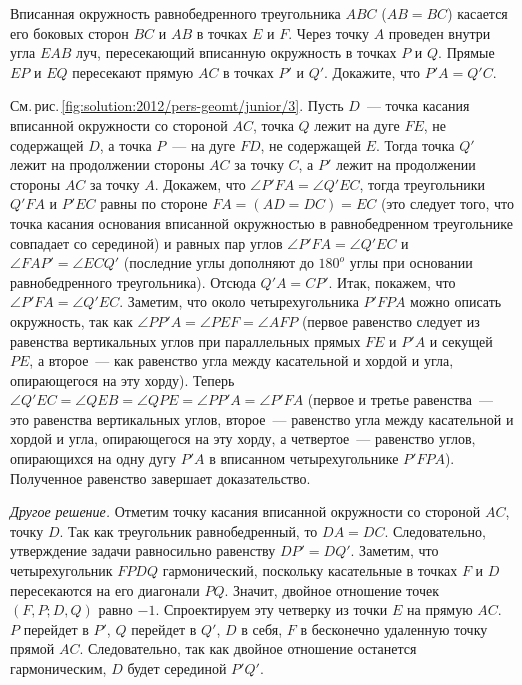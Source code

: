 \problem
Вписанная окружность равнобедренного треугольника $ABC$ ($AB = BC$) касается
его боковых сторон $BC$ и $AB$ в точках $E$ и $F$.
Через точку $A$ проведен внутри угла $EAB$ луч, пересекающий вписанную
окружность в точках $P$ и $Q$.
Прямые $EP$ и $EQ$ пересекают прямую $AC$ в точках $P'$ и $Q'$.
Докажите, что $P'A = Q'C$.

%
\label{solution:2012/pers-geomt/junior/3}%
См.\,рис.\,\ref{fig:solution:2012/pers-geomt/junior/3}.
Пусть $D$~--- точка касания вписанной окружности со стороной $AC$,
точка $Q$ лежит на дуге $FE$, не содержащей $D$,
а точка $P$~--- на дуге $FD$, не содержащей $E$.
Тогда точка $Q'$ лежит на продолжении стороны $AC$ за точку $C$,
а $P'$ лежит на продолжении стороны $AC$ за точку $A$.
Докажем, что $\angle P'FA = \angle Q'EC$, тогда треугольники $Q'FA$ и $P'EC$
равны по стороне $FA = (AD = DC) = EC$
(это следует того, что точка касания основания вписанной окружностью
в равнобедренном треугольнике совпадает со серединой)
и равных пар углов $\angle P'FA = \angle Q'EC$ и $\angle FAP' = \angle ECQ'$
(последние углы дополняют до $180^o$ углы при основании равнобедренного
треугольника).
Отсюда $Q'A = CP'$.
Итак, покажем, что $\angle P'FA = \angle Q'EC$.
Заметим, что около четырехугольника $P'FPA$ можно описать окружность, так как
$\angle PP'A = \angle PEF = \angle AFP$
(первое равенство следует из равенства вертикальных углов при параллельных
прямых $FE$ и $P'A$ и секущей $PE$, а второе~--- как равенство угла между
касательной и хордой и угла, опирающегося на эту хорду).
Теперь $\angle Q'EC = \angle QEB = \angle QPE = \angle PP'A = \angle P'FA$
(первое и третье равенства~--- это равенства вертикальных углов,
второе~--- равенство угла между касательной и хордой и угла, опирающегося на
эту хорду, а четвертое~--- равенство углов, опирающихся на одну дугу $P'A$
в вписанном четырехугольнике $P'FPA$).
Полученное равенство завершает доказательство.
\par
\emph{Другое решение.}
Отметим точку касания вписанной окружности со стороной $AC$, точку $D$.
Так как треугольник равнобедренный, то $DA = DC$.
Следовательно, утверждение задачи равносильно равенству $DP' = DQ'$.
Заметим, что четырехугольник $FPDQ$ гармонический, поскольку касательные в
точках $F$ и $D$ пересекаются на его диагонали $PQ$.
Значит, двойное отношение точек $(F, P; D, Q)$ равно $-1$.
Спроектируем эту четверку из точки $E$ на прямую $AC$.
$P$ перейдет в $P'$, $Q$ перейдет в $Q'$, $D$ в себя, $F$ в бесконечно
удаленную точку прямой $AC$.
Следовательно, так как двойное отношение останется гармоническим, $D$ будет
серединой $P'Q'$.

\endproblem
